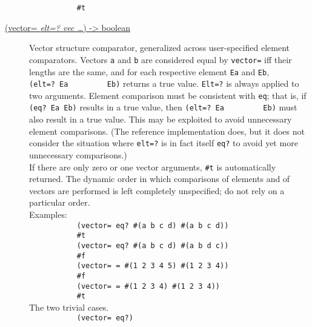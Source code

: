 \begin{description}
\texttt{\ \ \ \ \ \ \ \ \ \ \ \#t\ \ \ \ \ \ \ \ \ }\\[2\baselineskip]
\item[ \href{}{(vector= \emph{elt=? vec \ldots{}}) -\textgreater{}
boolean} ]
Vector structure comparator, generalized across user-specified element
comparators. Vectors \texttt{a} and \texttt{b} are considered equal by
\texttt{vector=} iff their lengths are the same, and for each respective
element \texttt{Ea} and \texttt{Eb},
\texttt{(elt=?\ Ea\ \ \ \ \ \ \ \ \ Eb)} returns a true value.
\texttt{Elt=?} is always applied to two arguments. Element comparison
must be consistent with \texttt{eq}; that is, if \texttt{(eq?\ Ea\ Eb)}
results in a true value, then \texttt{(elt=?\ Ea\ \ \ \ \ \ \ \ \ Eb)}
must also result in a true value. This may be exploited to avoid
unnecessary element comparisons. (The reference implementation does, but
it does not consider the situation where \texttt{elt=?} is in fact
itself \texttt{eq?} to avoid yet more unnecessary
comparisons.)\\[2\baselineskip]If there are only zero or one vector
arguments, \texttt{\#t} is automatically returned. The dynamic order in
which comparisons of elements and of vectors are performed is left
completely unspecified; do not rely on a particular
order.\\[2\baselineskip]Examples:\\[2\baselineskip]\texttt{\ \ \ \ \ \ \ \ \ \ \ (vector=\ eq?\ \textquotesingle{}\#(a\ b\ c\ d)\ \textquotesingle{}\#(a\ b\ c\ d))\ \ \ \ \ \ \ \ \ }\\
\texttt{\ \ \ \ \ \ \ \ \ \ \ \#t\ \ \ \ \ \ \ \ \ }\\[2\baselineskip]\texttt{\ \ \ \ \ \ \ \ \ \ \ (vector=\ eq?\ \textquotesingle{}\#(a\ b\ c\ d)\ \textquotesingle{}\#(a\ b\ d\ c))\ \ \ \ \ \ \ \ \ }\\
\texttt{\ \ \ \ \ \ \ \ \ \ \ \#f\ \ \ \ \ \ \ \ \ }\\[2\baselineskip]\texttt{\ \ \ \ \ \ \ \ \ \ \ (vector=\ =\ \textquotesingle{}\#(1\ 2\ 3\ 4\ 5)\ \textquotesingle{}\#(1\ 2\ 3\ 4))\ \ \ \ \ \ \ \ \ }\\
\texttt{\ \ \ \ \ \ \ \ \ \ \ \#f\ \ \ \ \ \ \ \ \ }\\[2\baselineskip]\texttt{\ \ \ \ \ \ \ \ \ \ \ (vector=\ =\ \textquotesingle{}\#(1\ 2\ 3\ 4)\ \textquotesingle{}\#(1\ 2\ 3\ 4))\ \ \ \ \ \ \ \ \ }\\
\texttt{\ \ \ \ \ \ \ \ \ \ \ \#t\ \ \ \ \ \ \ \ \ }\\[2\baselineskip]The
two trivial
cases.\\[2\baselineskip]\texttt{\ \ \ \ \ \ \ \ \ \ \ (vector=\ eq?)\ \ \ \ \ \ \ \ \ }\\

\end{description}
